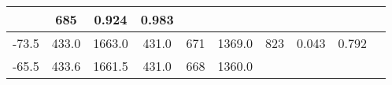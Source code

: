 \documentclass[a4paper,10pt]{article}
\begin{document}
\begin{longtable}{
     |
%    
    c|
%    
    c|
%    
    c|
%    
    c|
%    
    c|
%    
    c|
%    
    c|
%    
    c|
%    
    c|
%    
    c|
%    
    }
%        
        & 685
%        

%        

%        
        & 0.924
%        

%        

%        
        & 0.983
%        

%        
        \\
        \hline

        

%        

%        
        -73.5
%        

%        

%        
        & 433.0
%        

%        

%        
        & 1663.0
%        

%        

%        
        & 431.0
%        

%        

%        
        & 671
%        

%        

%        
        & 1369.0
%        

%        

%        
        & 823
%        

%        

%        
        & 0.043
%        

%        

%        
        & 0.792
%        

%        
        \\
        \hline

        

%        

%        
        -65.5
%        

%        

%        
        & 433.6
%        

%        

%        
        & 1661.5
%        

%        

%        
        & 431.0
%        

%        

%        
        & 668
%        

%        

%        
        & 1360.0
%        

%        


\end{longtable}
\end{document}
